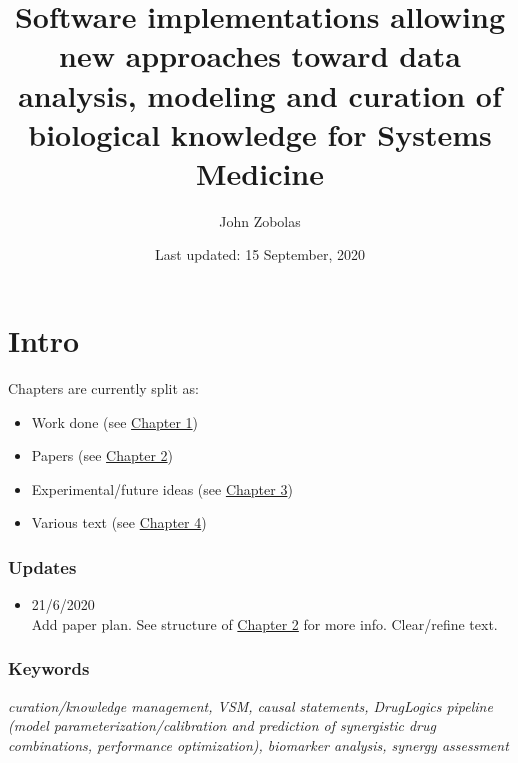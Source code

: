 \documentclass[
  12pt,
]{book}
\title{Software implementations allowing new approaches toward data analysis, modeling and curation of biological knowledge for Systems Medicine}
\author{John Zobolas}
\date{Last updated: 15 September, 2020}
\providecommand{\tightlist}{%
  \setlength{\itemsep}{0pt}\setlength{\parskip}{0pt}}
\begin{document}
\maketitle

{
\hypersetup{linkcolor=}
\setcounter{tocdepth}{1}
\tableofcontents
}
\listoftables
\listoffigures
{}
\hypertarget{intro}{%
\chapter*{Intro}\label{intro}}

Chapters are currently split as:

\begin{itemize}
\tightlist
\item
  Work done (see \protect\hyperlink{phd-work}{Chapter 1})
\item
  Papers (see \protect\hyperlink{phd-papers}{Chapter 2})
\item
  Experimental/future ideas (see \protect\hyperlink{phd-ideas}{Chapter 3})
\item
  Various text (see \protect\hyperlink{text}{Chapter 4})
\end{itemize}

\hypertarget{updates}{%
\subsection*{Updates}\label{updates}}

\begin{itemize}
\tightlist
\item
  21/6/2020\\
  Add paper plan.
  See structure of \protect\hyperlink{phd-papers}{Chapter 2} for more info.
  Clear/refine text.
\end{itemize}

\hypertarget{keywords}{%
\subsection*{Keywords}\label{keywords}}

\begin{blue-box}

\emph{curation/knowledge management, VSM, causal statements, DrugLogics pipeline
(model parameterization/calibration and prediction of synergistic drug combinations, performance optimization), biomarker analysis, synergy assessment}

\end{blue-box}
\end{document}
